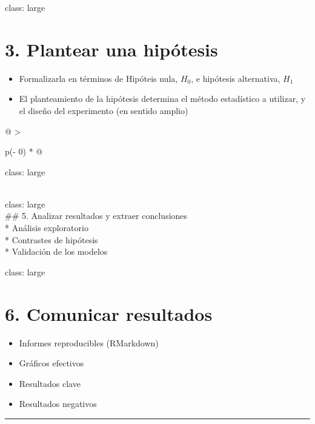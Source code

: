 \documentclass[
]{book}
\begin{document}
class: large

\hypertarget{plantear-una-hipuxf3tesis}{%
\section{3. Plantear una hipótesis}\label{plantear-una-hipuxf3tesis}}

\begin{itemize}
\item
  Formalizarla en términos de Hipóteis nula, \(H_0\), e hipótesis alternativa, \(H_1\)
\item
  El planteamiento de la hipótesis determina
  el método estadístico a utilizar, y el diseño
  del experimento (en sentido amplio)
\end{itemize}

\begin{longtable}[]{@{}
  >{\raggedright\arraybackslash}p{(\columnwidth - 0\tabcolsep) * }@{}}
\toprule
\begin{minipage}[b]{\linewidth}\raggedright
class: large
\end{minipage} \\
\midrule
\endhead
class: large \\
\#\# 5. Analizar resultados y extraer conclusiones \\
* Análisis exploratorio \\
* Contrastes de hipótesis \\
* Validación de los modelos \\
\bottomrule
\end{longtable}

class: large

\hypertarget{comunicar-resultados}{%
\section{6. Comunicar resultados}\label{comunicar-resultados}}

\begin{itemize}
\item
  Informes reproducibles (RMarkdown)
\item
  Gráficos efectivos
\item
  Resultados clave
\item
  Resultados negativos
\end{itemize}

\begin{center}\rule{0.5\linewidth}{0.5pt}\end{center}
\end{document}

